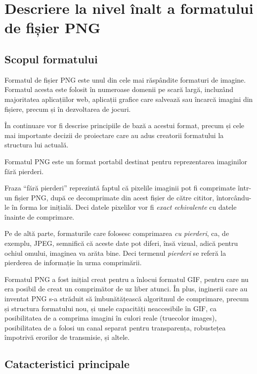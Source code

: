 \documentclass[a4paper,12pt]{report}
\begin{document}
\section{Descriere la nivel înalt a formatului de fișier \ac{PNG}}

\subsection{Scopul formatului}

Formatul de fișier \ac{PNG} este unul din cele mai răspândite formaturi de imagine.
Formatul acesta este folosit în numeroase domenii pe scară largă, incluzând majoritatea aplicațiilor
web, aplicații grafice care salvează sau încarcă imagini din fișiere, precum și în dezvoltarea de jocuri.

În continuare vor fi descrise principiile de bază a acestui format,
precum și cele mai importante decizii de proiectare care au adus creatorii formatului la structura lui actuală.

Formatul \ac{PNG} este un format portabil destinat pentru reprezentarea imaginilor fără pierderi.

Fraza ``fără pierderi'' reprezintă faptul că pixelile imaginii
pot fi comprimate într-un fișier \ac{PNG},
după ce decomprimate din acest fișier de către cititor,
întorcându-le în forma lor inițială.
Deci datele pixelilor vor fi \textit{exact echivalente} cu datele înainte de comprimare.

Pe de altă parte, formaturile care folosesc comprimarea \textit{cu pierderi},
ca, de exemplu, \ac{JPEG}, semnifică că aceste date pot diferi,
însă vizual, adică pentru ochiul omului, imaginea va arăta bine.
Deci termenul \textit{pierderi} se referă la pierderea de informație în urma comprimării.

Formatul \ac{PNG} a fost inițial creat pentru a înlocui formatul \ac{GIF},
pentru care nu era posibil de creat un comprimător de uz liber atunci\cite{gif_unusable_reason}.
În plus, inginerii care au inventat \ac{PNG} s-a străduit să îmbunătățească algoritmul de comprimare,
precum și structura formatului nou, și unele capacități neaccesibile în \ac{GIF},
ca posibilitatea de a comprima imagini în culori reale (truecolor images),
posibilitatea de a folosi un canal separat pentru transparența,
robustețea împotrivă erorilor de transmisie, și altele.

\subsection{Catacteristici principale}
\end{document}
